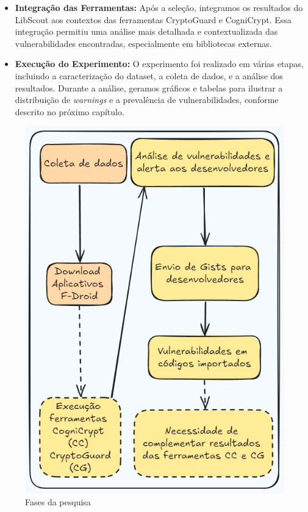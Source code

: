 \begin{itemize}
\item \textbf{Integração das Ferramentas:} Após a seleção, integramos os resultados do LibScout aos contextos das ferramentas CryptoGuard e CogniCrypt. Essa integração permitiu uma análise mais detalhada e contextualizada das vulnerabilidades encontradas, especialmente em bibliotecas externas.

\item \textbf{Execução do Experimento:} O experimento foi realizado em várias etapas, incluindo a caracterização do dataset, a coleta de dados, e a análise dos resultados. Durante a análise, geramos gráficos e tabelas para ilustrar a distribuição de \textit{warnings} e a prevalência de vulnerabilidades, conforme descrito no próximo capítulo.

\end{itemize}

\begin{figure}[!ht]
  \centering
  \includegraphics[scale=0.4]{img/research_steps1.png}
  \caption{Fases da pesquisa}
  \label{img: research_steps}
\end{figure}

